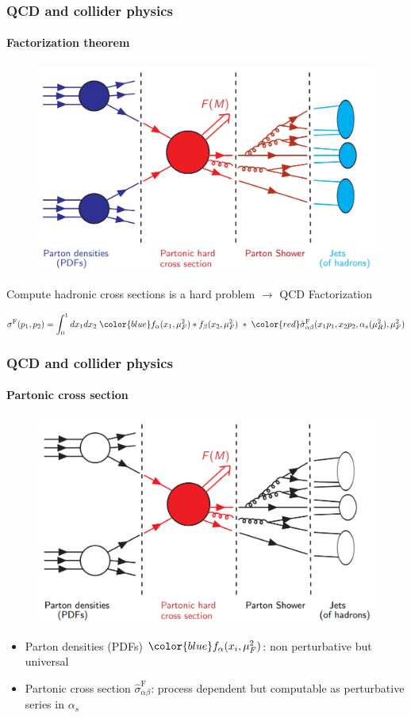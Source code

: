 \documentclass[aspectratio=43]{beamer}
\begin{document}
\begin{frame}

	\frametitle{QCD and collider physics}
	\framesubtitle{Factorization theorem}

	\vspace{0.4 cm}
	
	\begin{figure}
		\includegraphics[width = 7 cm]{plots/part1/factorization_1.png}
	\end{figure}
	
	Compute hadronic cross sections is a {\color{red}hard problem} $\longrightarrow$ {\color{blue} QCD Factorization}
	
	\begin{equation}
		\sigma^{\textrm{F}}(p_{1}, p_{2}) =
		\int_{0}^{1} dx_{1} dx_{2} \; {\color{blue} f_{\alpha}(x_{1}, \mu_{F}^{2}) \ast f_{\beta}(x_{2}, \mu_{F}^{2})}
		\; \ast \;  
		{\color{red}\hat{\sigma}^{\textrm{F}}_{\alpha \beta}(x_{1}p_{1}, x_{2}p_{2}, \alpha_{s}(\mu_{R}^{2}), \mu_{F}^{2})} \nonumber
	\end{equation}

\end{frame}

\begin{frame}
	
	\frametitle{QCD and collider physics}
	\framesubtitle{Partonic cross section}
	
	\begin{figure}
		\includegraphics[width = 7 cm]{plots/part1/factorization_2.png}
	\end{figure}
	
	\begin{itemize}
		\item Parton densities (PDFs) ${\color{blue} f_{\alpha}(x_{i}, \mu_{F}^{2})}$: non perturbative but universal
		\item Partonic cross section {\color{red}$\hat{\sigma}^{\textrm{F}}_{\alpha \beta}$}: process dependent but computable as perturbative series in $\alpha_{s}$
	\end{itemize}
	
\end{frame}
\end{document}
